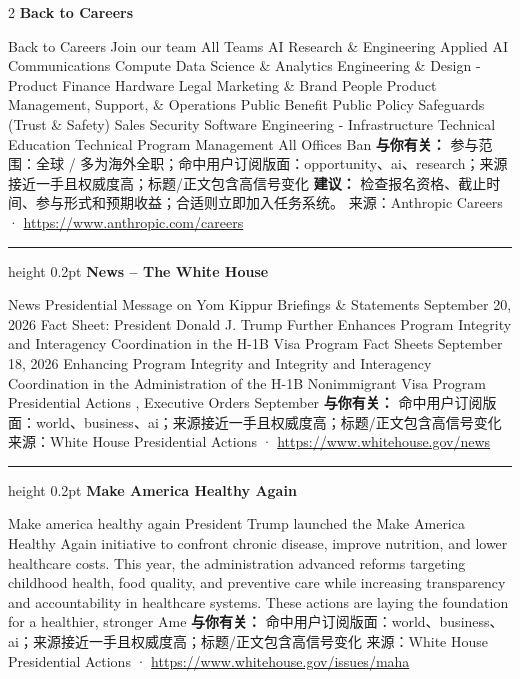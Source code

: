 \documentclass[10.5pt]{ctexart}
\begin{document}
\begin{multicols}{2}
{\large\bfseries Back to Careers}\par
Back to Careers Join our team All Teams AI Research \& Engineering Applied AI Communications Compute Data Science \& Analytics Engineering \& Design - Product Finance Hardware Legal Marketing \& Brand People Product Management, Support, \& Operations Public Benefit Public Policy Safeguards (Trust \& Safety) Sales Security Software Engineering - Infrastructure Technical Education Technical Program Management All Offices Ban
\textbf{与你有关：} 参与范围：全球 / 多为海外全职；命中用户订阅版面：opportunity、ai、research；来源接近一手且权威度高；标题/正文包含高信号变化
\textbf{建议：} 检查报名资格、截止时间、参与形式和预期收益；合适则立即加入任务系统。
{\footnotesize\color{ormuted} 来源：Anthropic Careers · \url{https://www.anthropic.com/careers}}
\vspace{2mm}
\hrule height 0.2pt
\vspace{2mm}
{\large\bfseries News – The White House}\par
News Presidential Message on Yom Kippur Briefings \& Statements September 20, 2026 Fact Sheet: President Donald J. Trump Further Enhances Program Integrity and Interagency Coordination in the H-1B Visa Program Fact Sheets September 18, 2026 Enhancing Program Integrity and Integrity and Interagency Coordination in the Administration of the H-1B Nonimmigrant Visa Program Presidential Actions , Executive Orders September
\textbf{与你有关：} 命中用户订阅版面：world、business、ai；来源接近一手且权威度高；标题/正文包含高信号变化
{\footnotesize\color{ormuted} 来源：White House Presidential Actions · \url{https://www.whitehouse.gov/news}}
\vspace{2mm}
\hrule height 0.2pt
\vspace{2mm}
{\large\bfseries Make America Healthy Again}\par
Make america healthy again President Trump launched the Make America Healthy Again initiative to confront chronic disease, improve nutrition, and lower healthcare costs. This year, the administration advanced reforms targeting childhood health, food quality, and preventive care while increasing transparency and accountability in healthcare systems. These actions are laying the foundation for a healthier, stronger Ame
\textbf{与你有关：} 命中用户订阅版面：world、business、ai；来源接近一手且权威度高；标题/正文包含高信号变化
{\footnotesize\color{ormuted} 来源：White House Presidential Actions · \url{https://www.whitehouse.gov/issues/maha}}

\end{multicols}
\end{document}

